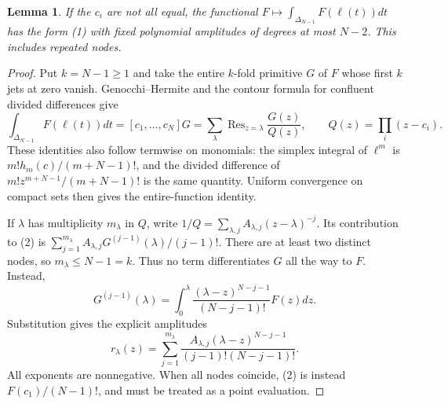 \documentclass[11pt]{article}
\newtheorem{lemma}[theorem]{Lemma}
\DeclareMathOperator{\Res}{Res}
\begin{document}
\begin{lemma}\label{lem:chain-representation}
If the $c_i$ are not all equal, the functional
$F\mapsto\int_{\Delta_{N-1}}F(\ell(t))dt$ has the form (1) with fixed
polynomial amplitudes of degrees at most $N-2$. This includes repeated nodes.
\end{lemma}
\begin{proof}
Put $k=N-1\ge1$ and take the entire $k$-fold primitive $G$ of $F$ whose
first $k$ jets at zero vanish. Genocchi--Hermite and the contour formula
for confluent divided differences give
\[
 \int_{\Delta_{N-1}}F(\ell(t))dt
   =[c_1,\ldots,c_N]G
   =\sum_{\lambda}\Res_{z=\lambda}\frac{G(z)}{Q(z)},
 \qquad Q(z)=\prod_i(z-c_i).                               \tag{2}
\]
These identities also follow termwise on monomials: the simplex integral
of $\ell^m$ is $m!h_m(c)/(m+N-1)!$, and the divided difference of
$m!z^{m+N-1}/(m+N-1)!$ is the same quantity. Uniform convergence on compact
sets then gives the entire-function identity.

If $\lambda$ has multiplicity $m_\lambda$ in $Q$, write
$1/Q=\sum_{\lambda,j} A_{\lambda,j}(z-\lambda)^{-j}$.
Its contribution to (2) is
$\sum_{j=1}^{m_\lambda}A_{\lambda,j}G^{(j-1)}(\lambda)/(j-1)!$.
There are at least two distinct nodes, so $m_\lambda\le N-1=k$.
Thus no term differentiates $G$ all the way to $F$. Instead,
\[
 G^{(j-1)}(\lambda)=
 \int_0^\lambda\frac{(\lambda-z)^{N-j-1}}{(N-j-1)!}F(z)dz.
\]
Substitution gives the explicit amplitudes
\[
 r_\lambda(z)=\sum_{j=1}^{m_\lambda}
 \frac{A_{\lambda,j}(\lambda-z)^{N-j-1}}
 {(j-1)!(N-j-1)!}.                                       \tag{3}
\]
All exponents are nonnegative. When all nodes coincide, (2) is instead
$F(c_1)/(N-1)!$, and must be treated as a point evaluation.
\end{proof}
\end{document}
